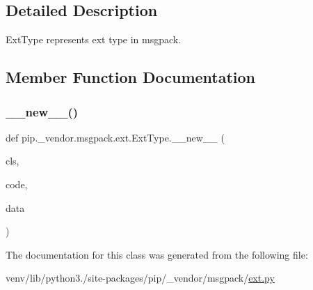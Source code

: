 \subsection{Detailed Description}
\begin{DoxyVerb}ExtType represents ext type in msgpack.\end{DoxyVerb}
 

\subsection{Member Function Documentation}
\mbox{\label{classpip_1_1__vendor_1_1msgpack_1_1ext_1_1ExtType_a0c4070b7a3692078490834f7bc303448}} 
\subsubsection{\texorpdfstring{\+\_\+\+\_\+new\+\_\+\+\_\+()}{\_\_new\_\_()}}
{\footnotesize\ttfamily def pip.\+\_\+vendor.\+msgpack.\+ext.\+Ext\+Type.\+\_\+\+\_\+new\+\_\+\+\_\+ (\begin{DoxyParamCaption}\item[{}]{cls,  }\item[{}]{code,  }\item[{}]{data }\end{DoxyParamCaption})}



The documentation for this class was generated from the following file\+:\begin{DoxyCompactItemize}
\item 
venv/lib/python3./site-\/packages/pip/\+\_\+vendor/msgpack/\hyperlink{ext_8py}{ext.\+py}\end{DoxyCompactItemize}
